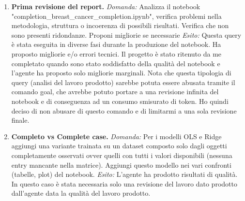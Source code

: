 \documentclass[10pt,a4paper]{article}
\begin{document}
\begin{enumerate}
\item \textbf{Prima revisione del report.}
\emph{Domanda:} Analizza il notebook "completion\_breast\_cancer\_completion.ipynb", verifica problemi nella metodologia, struttura o 
incoerenza di possibili risultati. Verifica che non sono presenti ridondanze. Proponi migliorie se necessarie
\emph{Esito:} Questa query è stata eseguita in diverse fasi durante la produzione del notebook. Ha proposto migliorie
 e/o errori tecnici. Il progetto è stato ritenuto da me completato quando sono stato soddisfatto della qualità del notebook e l'agente
 ha proposto solo migliorie marginali. Nota che questa tipologia di query (analisi del lavoro prodotto) sarebbe potuta essere abusata
 tramite il comando goal, che avrebbe potuto portare a una revisione infinita del notebook e di conseguenza ad un consumo smisurato di token. 
 Ho quindi deciso di non abusare di questo comando e di limitarmi a una sola revisione finale. 

\item \textbf{Completo vs Complete case.}
\emph{Domanda:} Per i modelli OLS e Ridge aggiungi una variante trainata su un dataset composto solo dagli oggetti completamente osservati 
ovver quelli con tutti i valori disponibili (nessuna entry mancante nella matrice). Aggiungi questo modello nei vari 
confronti (tabelle, plot) del notebook.
\emph{Esito:} L'agente ha prodotto risultati di qualità. In questo caso è stata necessaria solo una revisione del lavoro dato
prodotto dall'agente data la qualità del lavoro prodotto.
\end{enumerate}
\end{document}
